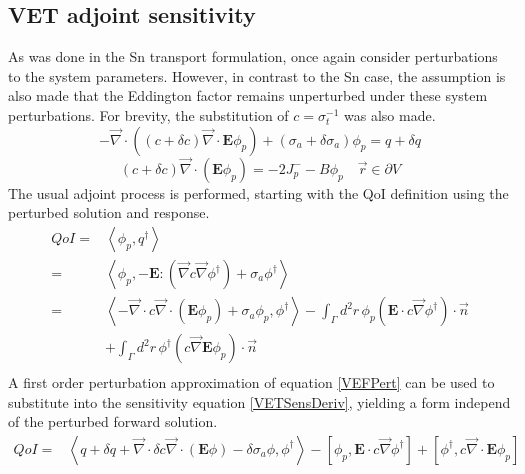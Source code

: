 \documentclass{article}
\newcommand{\vr}{\vec{r}}
\newcommand{\bra}{\left\langle}
\newcommand{\ket}{\right\rangle}
\newcommand{\sbra}{\left[}
\newcommand{\sket}{\right]}
\newcommand{\vdiv}{\vec{\nabla} \cdot}
\newcommand{\vgrad}{\vec{\nabla}}
\newcommand{\bound}{\partial V}
\newcommand{\Edd}{\mathbf{E}}
\newcommand{\sigt}{\sigma_t}
\newcommand{\siga}{\sigma_a}
\newcommand{\isigt}{c}
\newcommand{\scalSource}{q}
\newcommand{\scalResp}{q^\dag}
\newcommand{\qoi}{QoI}
\begin{document}
\subsection{VET adjoint sensitivity}

As was done in the Sn transport formulation, once again consider perturbations to the system parameters. However, in contrast to the Sn case, the assumption is also made that the Eddington factor remains unperturbed under these system perturbations. For brevity, the substitution of $\isigt = \sigt^{-1}$ was also made.
\begin{equation}
\label{VEFPert}
- \vdiv \left((\isigt + \delta \isigt)\vdiv \Edd \phi_p \right) + (\siga + \delta \siga)\phi_p = \scalSource + \delta \scalSource
\end{equation}
\begin{equation}
(\isigt + \delta \isigt) \vec{\nabla} \cdot \left(\Edd \phi_p \right)  = - 2J_p^- - B \phi_p \quad \vr \in \bound
\end{equation}
The usual adjoint process is performed, starting with the QoI definition using the perturbed solution and response. 
\begin{equation}
\label{VETSensDeriv}
\begin{split}
\qoi=&\bra \phi_p , \scalResp \ket \\
=&\bra \phi_p , - \Edd : \left( \vgrad \isigt \vgrad \phi^\dag \right) + \siga \phi^\dag \ket \\
=& \bra - \vdiv \isigt \vdiv \left( \Edd \phi_p \right) + \siga \phi_p, \phi^\dag \ket 
- \int_\Gamma d^2 r \, \phi_p \left( \Edd \cdot \isigt \vgrad \phi^\dag \right) \cdot \vec{n}  \\ 
&+ \int_\Gamma d^2 r \, \phi^\dag \left(  \isigt \vgrad \Edd \phi_p \right) \cdot \vec{n} \\
\end{split}
\end{equation}
A first order perturbation approximation of equation \ref{VEFPert} can be used to substitute into the sensitivity equation \ref{VETSensDeriv}, yielding a form independ of the perturbed forward solution.
\begin{equation}
\label{QoIVETAdjNoBC}
\begin{split}
\qoi =& \bra \scalSource + \delta \scalSource + \vdiv \delta \isigt \vdiv \left( \Edd \phi \right) - \delta \siga \phi, \phi^\dag \ket - \sbra \phi_p, \Edd \cdot \isigt \vgrad \phi^\dag \sket + \sbra \phi^\dag, \isigt \vdiv \Edd \phi_p \sket 
\end{split}
\end{equation}
\end{document}
